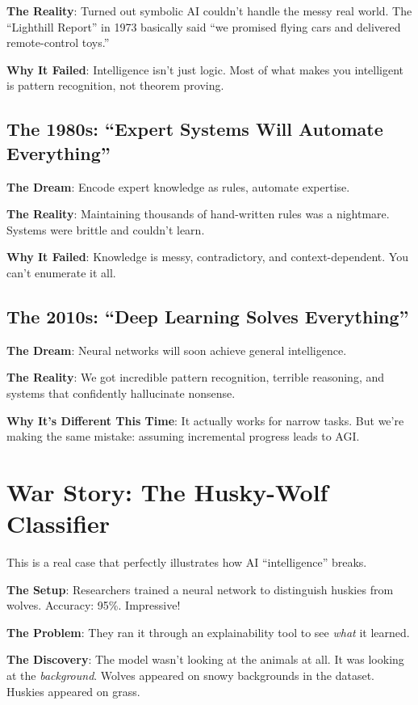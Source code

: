 \documentclass[11pt,oneside]{book}
\begin{document}
\textbf{The Reality}: Turned out symbolic AI couldn't handle the messy real world. The ``Lighthill Report'' in 1973 basically said ``we promised flying cars and delivered remote-control toys.''

\textbf{Why It Failed}: Intelligence isn't just logic. Most of what makes you intelligent is pattern recognition, not theorem proving.

\subsection{The 1980s: ``Expert Systems Will Automate Everything''}
\textbf{The Dream}: Encode expert knowledge as rules, automate expertise.

\textbf{The Reality}: Maintaining thousands of hand-written rules was a nightmare. Systems were brittle and couldn't learn.

\textbf{Why It Failed}: Knowledge is messy, contradictory, and context-dependent. You can't enumerate it all.

\subsection{The 2010s: ``Deep Learning Solves Everything''}
\textbf{The Dream}: Neural networks will soon achieve general intelligence.

\textbf{The Reality}: We got incredible pattern recognition, terrible reasoning, and systems that confidently hallucinate nonsense.

\textbf{Why It's Different This Time}: It actually works for narrow tasks. But we're making the same mistake: assuming incremental progress leads to AGI.

\section{War Story: The Husky-Wolf Classifier}

This is a real case that perfectly illustrates how AI ``intelligence'' breaks.

\textbf{The Setup}: Researchers trained a neural network to distinguish huskies from wolves. Accuracy: 95\%. Impressive!

\textbf{The Problem}: They ran it through an explainability tool to see \textit{what} it learned.

\textbf{The Discovery}: The model wasn't looking at the animals at all. It was looking at the \textit{background}. Wolves appeared on snowy backgrounds in the dataset. Huskies appeared on grass.
\end{document}
